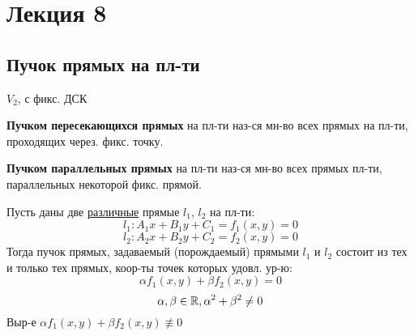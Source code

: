 \section{Лекция 8}

\subsection{Пучок прямых на пл-ти}
$V_2$, с фикс. ДСК
\begin{definition}
\textbf{Пучком пересекающихся прямых} на пл-ти наз-ся мн-во всех прямых на пл-ти, проходящих через. фикс. точку.
\end{definition}
\begin{definition}
\textbf{Пучком параллельных прямых} на пл-ти наз-ся мн-во всех прямых пл-ти, параллельных некоторой фикс. прямой.
\end{definition}
\begin{theorem}
Пусть даны две \underline{различные} прямые $l_1$, $l_2$ на пл-ти:
\[
l_1 \colon A_1x + B_1y + C_1 = f_1(x, y) = 0
\]
\[
l_2 \colon A_2x + B_2 y + C_2 = f_2(x, y) = 0
\]
Тогда пучок прямых, задаваемый (порождаемый) прямыми $l_1$ и $l_2$ состоит из тех и только тех прямых, коор-ты точек которых удовл. ур-ю:
\begin{equation}
  \label{eq:puchok}
\alpha f_1(x, y) + \beta f_2(x, y) = 0
\end{equation}
\[
\alpha, \beta \in \mathbb{R}, \alpha^{2} + \beta^{2} \neq 0
\]
Выр-е $\alpha f_1(x, y) + \beta f_2(x, y) \not\equiv 0$
\end{theorem}
